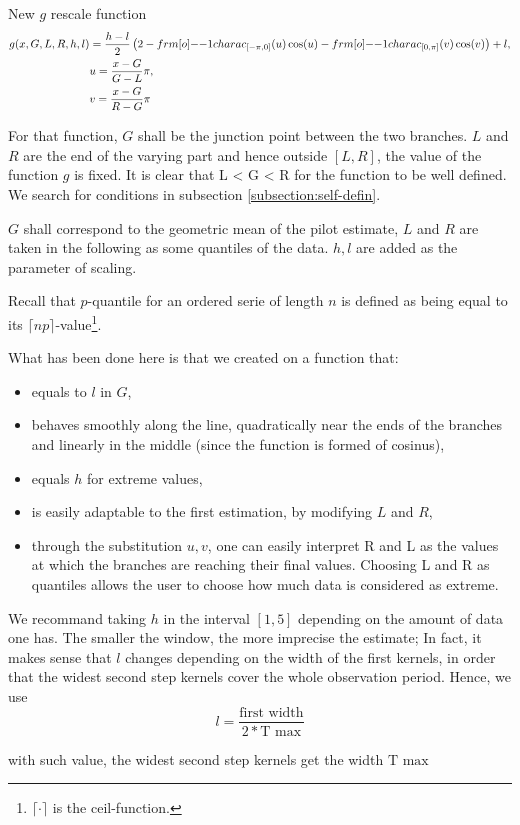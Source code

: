 \documentclass[11pt]{book}
\begin{document}
\begin{theoreme}[label = thrm:new_g]{New $g$ rescale function}
\begin{align}
\label{eq:new_g}
g(x, G, L,R,h,l) &=   \frac {h-l} 2 \left (2 
-  \11charac_{ [- \pi, 0]} (u)  \cos(u)
-  \11charac_{ [0, \pi]} (v)  \cos(v) \right ) + l,  \\
\quad & u = \frac{x - G}{G- L} \pi, \notag  \\
\quad & v = \frac{x - G}{R- G} \pi \notag
\end{align}

For that function, $G$ shall be the junction point between the two branches. $L$ and $R$ are the end of the varying part and hence outside $[L,R]$, the value of the function $g$ is fixed. It is clear that L < G < R for the function to be well defined. We search for conditions in subsection \ref{subsection:self-defin}.
\end{theoreme}

$G$ shall correspond to the geometric mean of the pilot estimate, $L$ and $R$ are taken in the following as some quantiles of the data. $h,l$ are added as the parameter of scaling.

Recall that $p$-quantile for an ordered serie of length $n$ is defined as being equal to its $\lceil{np}\rceil$-value\footnote{$\lceil{\cdot}\rceil$ is the ceil-function.}.


What has been done here is that we created on a function that:



\begin{itemize}
\item equals to $l$ in $G$, 
\item behaves smoothly along the line, quadratically near the ends of the branches and linearly in the middle (since the function is formed of cosinus),
\item equals $h$ for extreme values,
\item is easily adaptable to the first estimation, by modifying $L$ and $R$,
\item through the substitution $u,v$, one can easily interpret R and L as the values at which the branches are reaching their final values. Choosing L and R as quantiles allows the user to choose how much data is considered as extreme. 
\end{itemize}

\begin{remarque}
We recommand taking $h$ in the interval $[1,5]$ depending on the amount of data one has. The smaller the window, the more imprecise the estimate; In fact, it makes sense that $l$ changes depending on the width of the first kernels, in order that the widest second step kernels cover the whole observation period. Hence, we use $$l = \frac{ \text{first width} }{2* \text{T max} }$$

with such value, the widest second step kernels get the width $\text{T max}$
\end{remarque}
\end{document}
